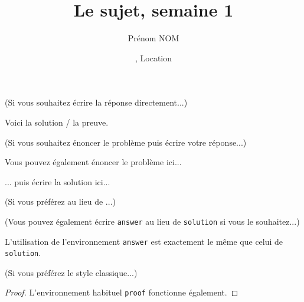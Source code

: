 \documentclass[11pt,
  logo = {example-image},
  title in boldface,
  theorem in new line,
]{homework}
\title{Le sujet, semaine 1}
\author{Prénom NOM}
\date{\TheDate{2023-12-25}, Location}
\begin{document}
\bigskip\textcolor{gray!55}{(Si vous souhaitez écrire la réponse directement...)}

\begin{problem}
    Voici la solution / la preuve.
\end{problem}


\bigskip\textcolor{gray!55}{(Si vous souhaitez énoncer le problème puis écrire votre réponse...)}

\begin{problem}
    Vous pouvez également énoncer le problème ici...
\end{problem}

\begin{solution}
    ... puis écrire la solution ici...
\end{solution}

\bigskip\textcolor{gray!55}{(Si vous préférez  au lieu de ...)}



\bigskip\textcolor{gray!55}{(Vous pouvez également écrire \texttt{answer} au lieu de \texttt{solution} si vous le souhaitez...)}

\begin{answer}
    L'utilisation de l'environnement \verb|answer| est exactement le même que celui de \verb|solution|.
\end{answer}


\bigskip\textcolor{gray!55}{(Si vous préférez le style classique...)}

\begin{proof}
    L'environnement habituel \verb|proof| fonctionne également.
\end{proof}


\end{document}
